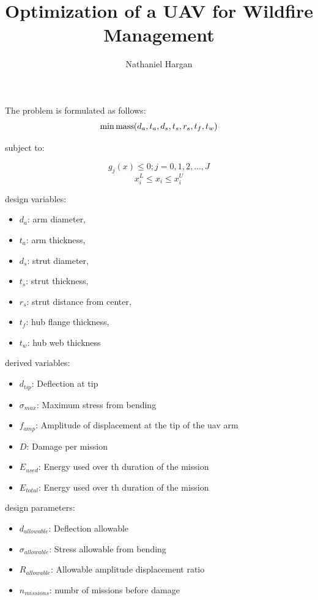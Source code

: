 \documentclass{article}
\title{Optimization of a UAV for Wildfire Management}
\author{Nathaniel Hargan}
\date{}
\begin{document}
	
	\maketitle
	
	\large
	
	The problem is formulated as follows:
	$$ \min \textnormal{mass}(d_a,t_a,d_s,t_s,r_s,t_f,t_w) $$
	
	subject to:
	
	$$g_j(x) \le 0; j = 0, 1, 2, ..., J$$
	$$x_i^L \le x_i \le x_i^U$$
	
	design variables: 
	
	\begin{itemize}
		\item $d_a$: arm diameter,
		\item $t_a$: arm thickness,
		\item $d_s$: strut diameter,
		\item $t_s$: strut thickness,
		\item $r_s$: strut distance from center,
		\item $t_f$: hub flange thickness,
		\item $t_w$: hub web thickness 
	\end{itemize}
	
	derived variables:
	\begin{itemize}
		\item $d_{tip}$: Deflection at tip
		\item $\sigma_{max}$: Maximum stress from bending 
		\item $f_{amp}$: Amplitude of displacement at the tip of the uav arm
		\item $D$: Damage per mission
		\item $ E_{used}$: Energy used over th duration of the mission
		\item $ E_{total}$: Energy used over th duration of the mission
		
	\end{itemize}
	
	design parameters:
	\begin{itemize}
		\item $d_{allowable}$: Deflection allowable
		\item $\sigma_{allowable}$: Stress allowable from bending 
		\item $R_{allowable}$: Allowable amplitude displacement ratio
		\item $n_{missions} $: numbr of missions before damage
	\end{itemize}
		
\end{document}
